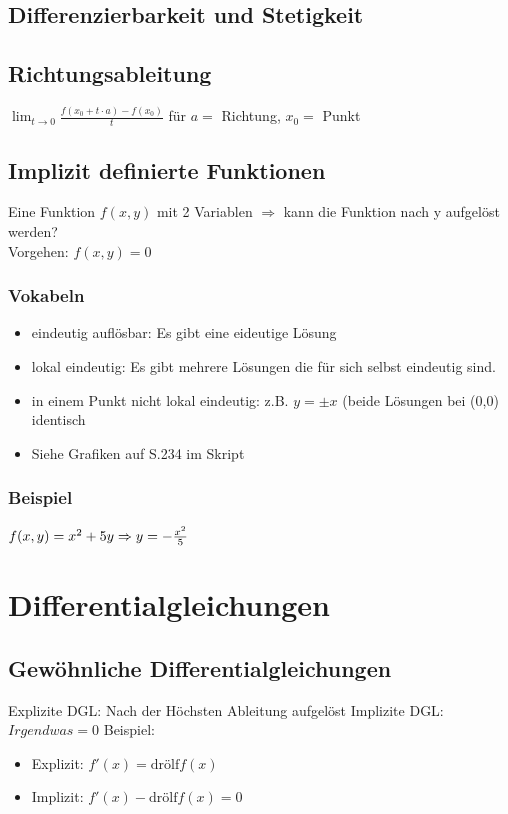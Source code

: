 \documentclass[a4paper,portrait]{scrartcl}
\begin{document}
\subsection{Differenzierbarkeit und Stetigkeit}
\subsection{Richtungsableitung}

$\lim_{t \rightarrow 0}\frac{f(x_0+t \cdot a)-f(x_0)}{t}$ für $a = $ Richtung, $x_0 = $ Punkt
\subsection{Implizit definierte Funktionen}
Eine Funktion $f(x,y)$ mit 2 Variablen $\Rightarrow$ kann die Funktion nach y aufgelöst werden? \\
Vorgehen: $f(x,y) = 0$ \\
\subsubsection*{Vokabeln}
\begin{itemize}
	\item eindeutig auflösbar: Es gibt eine eideutige Lösung
	\item lokal eindeutig: Es gibt mehrere Lösungen die für sich selbst eindeutig sind.
	\item in einem Punkt nicht lokal eindeutig: z.B. $y=\pm x$ (beide Lösungen bei (0,0) identisch
	\item Siehe Grafiken auf S.234 im Skript
\end{itemize}
\subsubsection*{Beispiel}
$f(x,y) = x^2+5y \\
\Rightarrow y = -\frac{x^2}{5}$
\section{Differentialgleichungen}
\subsection{Gewöhnliche Differentialgleichungen}
Explizite DGL: Nach der Höchsten Ableitung aufgelöst
Implizite DGL: $Irgendwas = 0$
Beispiel:
\begin{itemize}
	\item Explizit: $f'(x) = \text{drölf} f(x)$
	\item Implizit: $f'(x) - \text{drölf} f(x) = 0$
\end{itemize}
\end{document}
